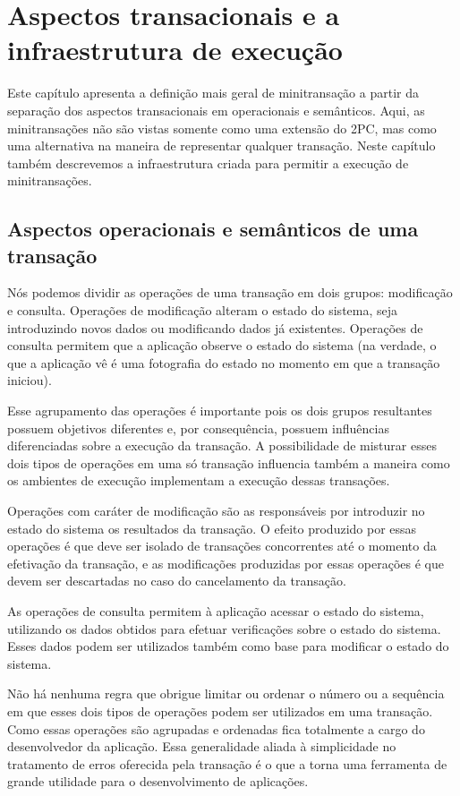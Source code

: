 \documentclass[11pt,twoside,a4paper]{book}
\begin{document}
\chapter{Aspectos transacionais e a infraestrutura de execução}
\label{chap:desenvolvimento}
Este capítulo apresenta a definição mais geral de minitransação a partir da separação dos aspectos transacionais em operacionais e semânticos. Aqui, as minitransações não são vistas somente como uma extensão do 2PC, mas como uma alternativa na maneira de representar qualquer transação. Neste capítulo também descrevemos a infraestrutura criada para permitir a execução de minitransações.

\section{Aspectos operacionais e semânticos de uma transação}
\label{aspectos_operacionais_e_semanticos}
Nós podemos dividir as operações de uma transação em dois grupos: modificação e consulta. Operações de modificação alteram o estado do sistema, seja introduzindo novos dados ou modificando dados já existentes. Operações de consulta permitem que a aplicação observe o estado do sistema (na verdade, o que a aplicação vê é uma fotografia do estado no momento em que a transação iniciou).

Esse agrupamento das operações é importante pois os dois grupos resultantes possuem objetivos diferentes e, por consequência, possuem influências diferenciadas sobre a execução da transação. A possibilidade de misturar esses dois tipos de operações em uma só transação influencia também a maneira como os ambientes de execução implementam a execução dessas transações.

Operações com caráter de modificação são as responsáveis por introduzir no estado do sistema os resultados da transação. O efeito produzido por essas operações é que deve ser isolado de transações concorrentes até o momento da efetivação da transação, e as modificações produzidas por essas operações é que devem ser descartadas no caso do cancelamento da transação. 

As operações de consulta permitem à aplicação acessar o estado do sistema, utilizando os dados obtidos para efetuar verificações sobre o estado do sistema. Esses dados podem ser utilizados também como base para modificar o estado do sistema.

Não há nenhuma regra que obrigue limitar ou ordenar o número ou a sequência em que esses dois tipos de operações podem ser utilizados em uma transação. Como essas operações são agrupadas e ordenadas fica totalmente a cargo do desenvolvedor da aplicação. Essa generalidade aliada à simplicidade no tratamento de erros oferecida pela transação é o que a torna uma ferramenta de grande utilidade para o desenvolvimento de aplicações.
\end{document}

